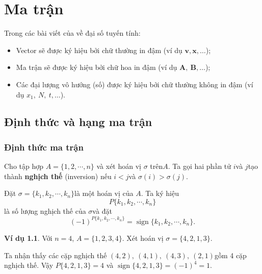 \documentclass{mynotes}
\theoremstyle{definition}
\newtheorem{example}{Ví dụ}
\DeclareMathOperator{\sign}{sign}
\begin{document}
\tableofcontents

\chapter{Ma trận}

Trong các bài viết của về đại số tuyến tính:

\begin{itemize}
    \item Vector sẽ được ký hiệu bởi chữ thường in đậm (ví dụ $\bm{v}, \bm{x}, \ldots$)​; 
    \item Ma trận sẽ được ký hiệu bởi chữ hoa in đậm (ví dụ $\bm{A},\ \bm{B}, \ldots$​);
    \item Các đại lượng vô hướng (số) được ký hiệu bởi chữ thường không in đậm (ví dụ $x_1,\ N,\ t, \ldots$).
\end{itemize}

\section{Định thức và hạng ma trận}

\subsection*{Định thức ma trận}

\begin{definition}
    Cho tập hợp $A = \{1, 2, \cdots, n\}$ và xét hoán vị $\sigma$ trên ​$A$. Ta gọi hai phần tử $i$​ và $j$​ tạo thành \textbf{nghịch thế} (inversion) nếu $i < j$​ và $\sigma(i) > \sigma(j)$.

    Đặt $\sigma = \{k_1, k_2, \cdots, k_n\}$​ là một hoán vị của $A$​. Ta ký hiệu \[ P\{k_1, k_2, \cdots, k_n\} \] là số lượng nghịch thế của $\sigma$​ và đặt \[ (-1)^{P\{k_1, k_2, \cdots, k_n\}} = \sign \{k_1, k_2, \cdots, k_n\}. \]
\end{definition}

\begin{example}
    Với $n=4$​, $A = \{1, 2, 3, 4\}$​. Xét hoán vị $\sigma = \{4, 2, 1, 3\}$.

    Ta nhận thấy các cặp nghịch thế $(4, 2),\ (4, 1),\ (4, 3),\ (2, 1)$​ gồm 4 cặp nghịch thế. Vậy $P\{4, 2, 1, 3\} = 4$ và $\sign \{4, 2, 1, 3\}=(-1)^4=1$​.
\end{example}
\end{document}
